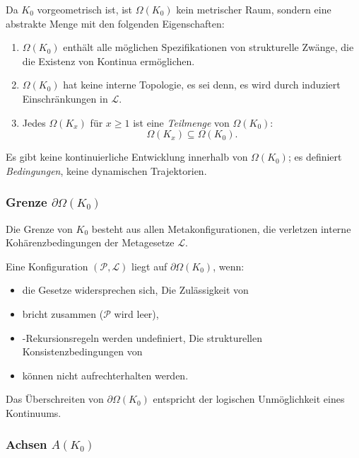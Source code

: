 Da $K_0$ vorgeometrisch ist, ist $\Omega(K_0)$ kein metrischer Raum, sondern
eine abstrakte Menge mit den folgenden Eigenschaften:
\begin{enumerate}
    \item $\Omega(K_0)$ enthält alle möglichen Spezifikationen von
          strukturelle Zwänge, die die Existenz von Kontinua ermöglichen.
    \item $\Omega(K_0)$ hat keine interne Topologie, es sei denn, es wird durch induziert
          Einschränkungen in $\mathcal{L}$.
    \item Jedes $\Omega(K_x)$ für $x \ge 1$ ist eine \emph{Teilmenge} von
          $\Omega(K_0)$:
          \[
              \Omega(K_x) \subseteq \Omega(K_0).
          \]
\end{enumerate}

Es gibt keine kontinuierliche Entwicklung innerhalb von $\Omega(K_0)$; es definiert
\emph{Bedingungen}, keine dynamischen Trajektorien.

\subsubsection{Grenze \texorpdfstring{$\partial\Omega(K_0)$}{\partial\Omega(K_0)}}

Die Grenze von $K_0$ besteht aus allen Metakonfigurationen, die verletzen
interne Kohärenzbedingungen der Metagesetze $\mathcal{L}$.

Eine Konfiguration $(\mathcal{P},\mathcal{L})$ liegt auf $\partial\Omega(K_0)$, wenn:
\begin{itemize}
    \item die Gesetze widersprechen sich,
    Die Zulässigkeit von \item bricht zusammen ($\mathcal{P}$ wird leer),
    \item-Rekursionsregeln werden undefiniert,
    Die strukturellen Konsistenzbedingungen von \item können nicht aufrechterhalten werden.
\end{itemize}

Das Überschreiten von $\partial\Omega(K_0)$ entspricht der logischen Unmöglichkeit
eines Kontinuums.

\subsubsection{Achsen \texorpdfstring{$A(K_0)$}{A(K_0)}}

